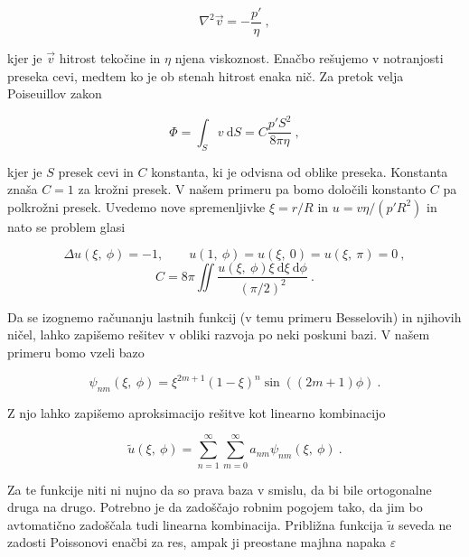 \documentclass[a4paper]{article}
\newcommand{\ddd}{\mathrm{d}}
\begin{document}
\begin{equation}
    \nabla^2 \vec{v} = -\frac{p'}{\eta}\>,
    \label{eq:poisson}
\end{equation}

kjer je $\vec{v}$ hitrost tekočine in $\eta$ njena viskoznost. Enačbo rešujemo v notranjosti preseka cevi, medtem ko
je ob stenah hitrost enaka nič. Za pretok velja Poiseuillov zakon

\begin{equation}
    \Phi = \int_S{v\>\ddd S}  = C \frac{p' S^2}{8\pi\eta}\>,
    \label{eq:poiseuille}
\end{equation}

kjer je $S$ presek cevi in $C$ konstanta, ki je odvisna od oblike preseka. Konstanta znaša $C = 1$ za krožni presek.
V našem primeru pa bomo določili konstanto $C$ pa polkrožni presek. Uvedemo nove spremenljivke $\xi = r/R$ in 
$u=v\eta/(p'R^2)$ in nato se problem glasi

\begin{equation}
    \Delta u(\xi,\>\phi) = -1, \qquad u(1,\>\phi) = u(\xi,\>0) = u(\xi,\>\pi) = 0\>,
    \label{eq:poisson2}
\end{equation}
\begin{equation}
    C = 8\pi \iint{\frac{u(\xi,\>\phi)\xi\>\ddd\xi\> \ddd\phi}{(\pi/2)^2}}\>.
\end{equation}

Da se izognemo računanju lastnih funkcij (v temu primeru Besselovih) in njihovih ničel, lahko zapišemo
rešitev v obliki razvoja po neki poskuni bazi. V našem primeru bomo vzeli bazo

\begin{equation}
    \psi_{nm}(\xi,\>\phi) = \xi^{2m+1}(1-\xi)^n \sin((2m+1)\phi)\>.
\end{equation}

Z njo lahko zapišemo aproksimacijo rešitve kot linearno kombinacijo 

\begin{equation}
    \tilde{u}(\xi,\>\phi) = \sum_{n=1}^{\infty}\sum_{m=0}^{\infty}{a_{nm}\psi_{nm}(\xi,\>\phi)}\>.
\end{equation}

Za te funkcije niti ni nujno da so prava baza v smislu, da bi bile ortogonalne druga na drugo. Potrebno je
da zadoščajo robnim pogojem tako, da jim bo avtomatično zadoščala tudi linearna kombinacija. Približna funkcija 
$\tilde{u}$ seveda ne zadosti Poissonovi enačbi za res, ampak ji preostane majhna napaka $\varepsilon$
\end{document}
